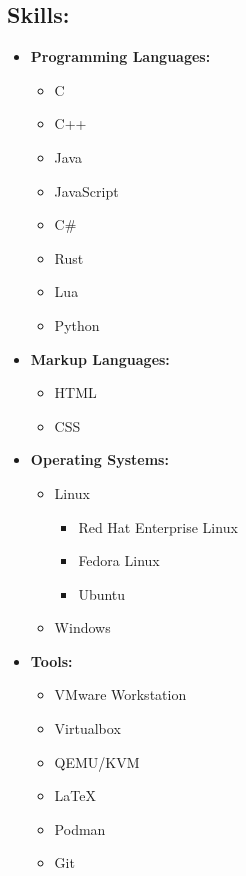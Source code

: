 \documentclass[12pt, oneside, a4paper]{article}
\begin{document}
\begin{paracol}{2}
\begin{leftcolumn}
        \section*{Skills:}
    \begin{itemize}
    \scriptsize
    \item \textbf{Programming Languages:}
          \begin{itemize}
              \item C
              \item C++
              \item Java
              \item JavaScript
              \item C\#
              \item Rust
              \item Lua
              \item Python
          \end{itemize}
    \item \textbf{Markup Languages:}
    \begin{itemize}
        \item HTML
        \item CSS
    \end{itemize}
    \item \textbf{Operating Systems:}
          \begin{itemize}
              \item Linux
                \begin{itemize}
                    \item Red Hat Enterprise Linux
                    \item Fedora Linux
                    \item Ubuntu
                \end{itemize} 
              \item Windows
          \end{itemize}
    \item \textbf{Tools:}
          \begin{itemize}
              \item VMware Workstation
              \item Virtualbox
              \item QEMU/KVM
              \item \LaTeX
              \item Podman
              \item Git
          \end{itemize}

\end{itemize}
\end{leftcolumn}
\end{paracol}
\end{document}

